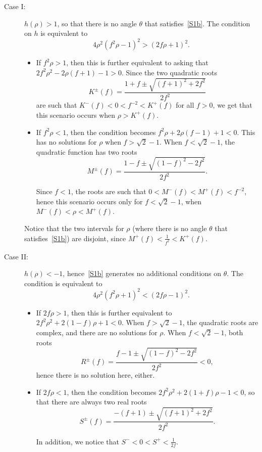 \documentclass[10pt]{article}
\begin{document}
\begin{description}
\item[Case I:] $h(\rho) > 1$, so that there is no angle $\theta$ that satisfies~\eqref{S1b}. The condition on $h$ is equivalent to
\[
    4 \rho^2 (f^2 \rho - 1)^2 > (2 f \rho + 1)^2.
\]

\begin{itemize}
    \item If $f^2 \rho > 1$, then this is further equivalent to asking that $2 f^2 \rho^2 - 2 \rho (f + 1) - 1 > 0$. Since the two quadratic roots
\[
K^{\pm}(f) = \frac{1 + f \pm \sqrt{(f + 1)^2+2f^2}}{2f^2}
\]
are such that $K^-(f) < 0 < f^{-2} < K^+(f)$ for all $f > 0$, we get that this scenario occurs when $\rho > K^+(f)$.

    \item If $f^2 \rho < 1$, then the condition becomes $f^2\rho + 2\rho(f-1)+1<0$. This has no solutions for $\rho$ when $f>\sqrt{2}-1$. When $f<\sqrt{2}-1$, the quadratic function has two roots
\[
M^{\pm}(f) = \frac{1-f \pm \sqrt{(1-f)^2-2f^2}}{2f^2}.
\]

Since $f < 1$, the roots are such that $0 < M^-(f) < M^+(f) < f^{-2}$, hence this scenario occurs only for $f < \sqrt{2}-1$, when $M^-(f) < \rho < M^+(f)$.
\end{itemize}

Notice that the two intervals for $\rho$ (where there is no angle $\theta$ that satisfies~\eqref{S1b}) are disjoint, since $M^+(f)<\frac{1}{f^2}< K^+(f)$.


\item[Case II:] $h(\rho) < -1$, hence~\eqref{S1b} generates no additional conditions on $\theta$. The condition is equivalent to
\[
4\rho^2(f^2\rho +1)^2 < (2f\rho-1)^2.
\]

\begin{itemize}
    \item If $2 f \rho > 1$, then this is further equivalent to $2f^2\rho^2+2(1-f)\rho+1<0$. When $f>\sqrt{2}-1$, the quadratic roots are complex, and there are no solutions for $\rho$. When $f<\sqrt{2}-1$, both roots
\[
    R^{\pm}(f) = \frac{f - 1 \pm \sqrt{(1 - f)^2 - 2 f^2}}{2 f^2} < 0,
\]
hence there is no solution here, either.

    \item If $2 f \rho < 1$, then the condition becomes $2f^2\rho^2+2(1+f)\rho-1<0$, so that there are always two real roots
\[
S^{\pm}(f) = \frac{-(f+1)\pm \sqrt{(f+1)^2+2f^2}}{2f^2}.
\]

In addition, we notice that $S^-<0<S^+<\frac{1}{2f}$.
\end{itemize}


\end{description}
\end{document}
